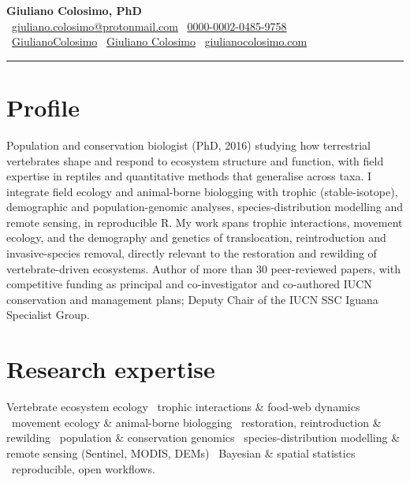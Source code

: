 \documentclass[11pt]{article}
\begin{document}
{\centering
 {\LARGE\bfseries Giuliano Colosimo, PhD}\\[0.35em]
 {\small \faEnvelope \ \href{mailto:giuliano.colosimo@protonmail.com}{giuliano.colosimo@protonmail.com} \quad
   \faOrcid \ \href{https://orcid.org/0000-0002-0485-9758}{0000-0002-0485-9758}}\\[0.25em]
 {\small \faGithub \ \href{https://github.com/GiulianoColosimo}{GiulianoColosimo} \quad
   \faResearchgate \ \href{https://www.researchgate.net/profile/Giuliano-Colosimo}{Giuliano Colosimo} \quad
   \faGlobe \ \href{https://www.giulianocolosimo.com}{giulianocolosimo.com}}\par}
\vspace{0.5em}\hrule\vspace{1.1em}

\section*{Profile}
Population and conservation biologist (PhD, 2016) studying how terrestrial vertebrates
shape and respond to ecosystem structure and function, with field expertise in reptiles and quantitative methods that generalise across taxa.
I integrate field ecology and animal-borne biologging with trophic (stable-isotope), 
demographic and population-genomic analyses, species-distribution modelling and remote sensing,
in reproducible R. My work spans trophic interactions, movement ecology, and the demography and genetics of translocation,
reintroduction and invasive-species removal, directly relevant to the restoration and rewilding of vertebrate-driven
ecosystems. Author of more than 30 peer-reviewed papers, with competitive funding as principal and co-investigator
and co-authored IUCN conservation and management plans; Deputy Chair of the IUCN SSC Iguana Specialist Group.

\section*{Research expertise}
\noindent Vertebrate ecosystem ecology \textbullet\ trophic interactions \& food-web dynamics \textbullet\ movement ecology \& animal-borne biologging \textbullet\ restoration, reintroduction \& rewilding \textbullet\ population \& conservation genomics \textbullet\ species-distribution modelling \& remote sensing (Sentinel, MODIS, DEMs) \textbullet\ Bayesian \& spatial statistics \textbullet\ reproducible, open workflows.
\end{document}
